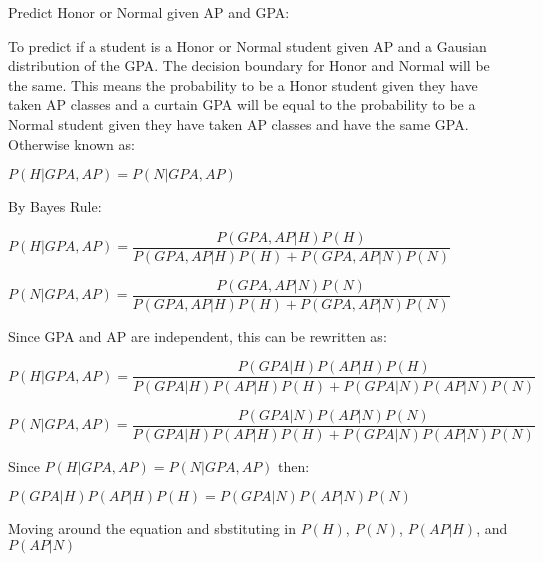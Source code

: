 \documentclass[11pt]{article}
\begin{document}
\noindent Predict Honor or Normal given AP and GPA:\newline

To predict if a student is a Honor or Normal student given AP and a Gausian distribution of the GPA. The decision boundary for Honor and Normal will be the same. This means the probability to be a Honor student given they have taken AP classes and a curtain GPA will be equal to the probability to be a Normal student given they have taken AP classes and have the same GPA. Otherwise known as:

\begin{center}
$P(H|GPA,AP) = P(N|GPA,AP)$
\end{center}

\newpage
By Bayes Rule:

\begin{center}
$P(H|GPA,AP) = \dfrac{P(GPA,AP|H)P(H)}{P(GPA,AP|H)P(H)+P(GPA,AP|N)P(N)}$

$P(N|GPA,AP) = \dfrac{P(GPA,AP|N)P(N)}{P(GPA,AP|H)P(H)+P(GPA,AP|N)P(N)}$
\end{center}

Since GPA and AP are independent, this can be rewritten as:

\begin{center}
$P(H|GPA,AP) = \dfrac{P(GPA|H)P(AP|H)P(H)}{P(GPA|H)P(AP|H)P(H)+P(GPA|N)P(AP|N)P(N)}$

$P(N|GPA,AP) = \dfrac{P(GPA|N)P(AP|N)P(N)}{P(GPA|H)P(AP|H)P(H)+P(GPA|N)P(AP|N)P(N)}$
\end{center}

Since $P(H|GPA,AP) = P(N|GPA,AP)$ then:

\begin{center}
$P(GPA|H)P(AP|H)P(H) = P(GPA|N)P(AP|N)P(N)$
\end{center}

Moving around the equation and sbstituting in $P(H)$, $P(N)$, $P(AP|H)$, and $P(AP|N)$
\end{document}
